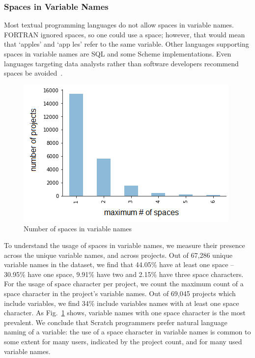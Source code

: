 \documentclass[conference]{IEEEtran}
\begin{document}
\subsubsection{Spaces in Variable Names}
Most textual programming languages do not allow spaces in variable names. 
FORTRAN ignored spaces, so one could use a space; however, that would mean that `apples' and `app les' refer to the same variable. Other languages supporting spaces in variable names are SQL and some Scheme implementations. 
Even languages targeting data analysts rather than software developers recommend spaces be avoided~\cite{Bochud}.
\begin{figure}[tb]
	\begin{center}
		\includegraphics[width=0.8\columnwidth]{fig/project/space_final}
		\caption{Number of spaces in variable names}
		\label{fig:number_of_spaces}
	\end{center}
\end{figure} 
To understand the usage of spaces in variable names, we measure their presence across the unique variable names, and across projects. Out of 67,286 unique variable names in the dataset, we find that 44.05\% have at least one space --30.95\% have one space, 9.91\% have two and 2.15\% have three space characters. For the usage of space character per project, we count the maximum count of a space character in the project's variable names. Out of 69,045 projects which include variables, we find 34\% include variables names with at least one space character. As Fig.~\ref{fig:number_of_spaces} shows, variable names with one space character is the most prevalent. 
We conclude that Scratch programmers prefer natural language naming of a variable: the use of a space character in variable names is common to some extent for many users, indicated by the project count, and for many used variable names. 
\end{document}
